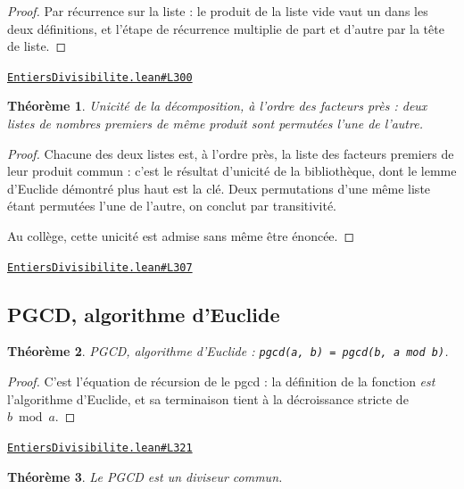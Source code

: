 \documentclass[11pt,a4paper]{article}
\theoremstyle{definition}
\theoremstyle{plain}
\newtheorem{theoreme}{Théorème}
\newcommand{\source}[2]{\par\smallskip\noindent\hfill{\footnotesize\href{#1}{\texttt{#2}}}\par\smallskip}
\begin{document}
\begin{proof}
Par récurrence sur la liste : le produit de la liste vide vaut un dans les deux
définitions, et l'étape de récurrence multiplie de part et d'autre par la tête de liste.
\end{proof}
\source{https://github.com/Commutator-IO/learn-lean/blob/main/cours/01-college/01-nombres-et-calculs/EntiersDivisibilite.lean\#L300}{EntiersDivisibilite.lean\#L300}

\begin{theoreme}
Unicité de la décomposition, à l'ordre des facteurs près : deux listes de nombres
premiers de même produit sont permutées l'une de l'autre.
\end{theoreme}

\begin{proof}
Chacune des deux listes est, à l'ordre près, la liste des facteurs premiers de leur
produit commun : c'est le résultat d'unicité de la bibliothèque, dont le lemme d'Euclide
démontré plus haut est la clé. Deux permutations d'une même liste étant permutées l'une de
l'autre, on conclut par transitivité.

Au collège, cette unicité est admise sans même être énoncée.
\end{proof}
\source{https://github.com/Commutator-IO/learn-lean/blob/main/cours/01-college/01-nombres-et-calculs/EntiersDivisibilite.lean\#L307}{EntiersDivisibilite.lean\#L307}

\subsection{PGCD, algorithme d'Euclide}

\begin{theoreme}
PGCD, algorithme d'Euclide : \texttt{pgcd(a, b) = pgcd(b, a mod b)}.
\end{theoreme}

\begin{proof}
C'est l'équation de récursion de le pgcd : la définition de la fonction
\emph{est} l'algorithme d'Euclide, et sa terminaison tient à la décroissance stricte de
$b \bmod a$.
\end{proof}
\source{https://github.com/Commutator-IO/learn-lean/blob/main/cours/01-college/01-nombres-et-calculs/EntiersDivisibilite.lean\#L321}{EntiersDivisibilite.lean\#L321}

\begin{theoreme}
Le PGCD est un diviseur commun.
\end{theoreme}
\end{document}
